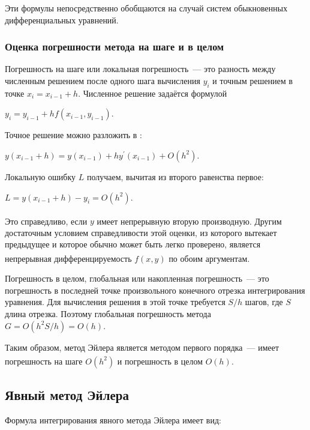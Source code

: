 \documentclass[a4paper]{article}
\begin{document}
{{{{{{{{Эти формулы непосредственно обобщаются на случай систем обыкновенных
дифференциальных уравнений.

\subsubsection{Оценка погрешности метода на шаге и в целом}

Погрешность на шаге или локальная погрешность~--- это разность между
численным решением после одного шага вычисления {{\(y_{i}\)}} и точным
решением в точке {{\(x_{i} = x_{i - 1} + h\)}}. Численное решение
задаётся формулой

\begin{center}
 {{\(y_{i} = y_{i - 1} + hf(x_{i - 1},y_{i - 1}).\quad\)}}
\end{center}

Точное решение можно разложить в :

\begin{center}
 {{\(y(x_{i - 1} + h) = y(x_{i - 1}) + hy^{\prime}(x_{i - 1}) + O(h^{2}).\)}}
\end{center}

Локальную ошибку {{\(L\)}} получаем, вычитая из второго равенства
первое:

\begin{center}
 {{\(L = y(x_{i - 1} + h) - y_{i} = O(h^{2}).\)}}
\end{center}

Это справедливо, если {{\(y\)}} имеет непрерывную вторую
производную\textsuperscript{}. Другим достаточным условием
справедливости этой оценки, из которого вытекает предыдущее и которое
обычно может быть легко проверено, является непрерывная
дифференцируемость {{\(f(x,y)\)}} по обоим аргументам\textsuperscript{}.

Погрешность в целом, глобальная или накопленная погрешность~--- это
погрешность в последней точке произвольного конечного отрезка
интегрирования уравнения. Для вычисления решения в этой точке требуется
{{\(S/h\)}} шагов, где {{\(S\)}} длина отрезка. Поэтому глобальная
погрешность метода {{\(G = O(h^{2}S/h) = O(h)\)}}.

Таким образом, метод Эйлера является методом первого порядка~--- имеет
погрешность на шаге {{\(O(h^{2})\)}} и погрешность в целом
{{\(O(h)\)}}\textsuperscript{}.

\subsection{Явный метод Эйлера}
Формула интегрирования явного метода Эйлера имеет вид:

}}}}}}}}
\end{document}
